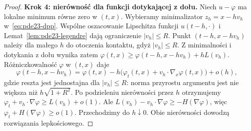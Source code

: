 \begin{proof}
\textbf{Krok 4: nierówność dla funkcji dotykającej z dołu.}
Niech $u-\varphi$ ma lokalne minimum równe zero
w $(t,x)$. Wybieramy minimalizator $z_h=x-hv_h$
w~\eqref{eq:pde23-dpp}. Wspólne oszacowanie Lipschitza
funkcji $u(t-h,\cdot)$ i Lemat~\ref{lem:pde23-legendre}
dają ograniczenie $|v_h|\le R$.
Punkt $(t-h,x-hv_h)$ należy dla małego $h$
do otoczenia kontaktu, gdyż $|v_h|\le R$.
Z minimalności i dotykania z dołu wynika zatem
$\varphi(t,x)\ge\varphi(t-h,x-hv_h)+hL(v_h)$.
Różniczkowalność $\varphi$ w $(t,x)$ daje
\[
 \varphi(t-h,x-hv_h)=\varphi(t,x)
 -h\bigl(\varphi_t(t,x)+v_h\cdot\nabla_x\varphi(t,x)\bigr)
 +o(h),
\]
gdzie reszta jest jednostajna dla $|v_h|\le R$:
norma przyrostu argumentu jest nie większa
niż $h\sqrt{1+R^2}$. Po podzieleniu nierówności
przez $h$ otrzymujemy
$\varphi_t+v_h\cdot\nabla\varphi\ge L(v_h)+o(1)$.
Ale $L(v_h)-v_h\cdot\nabla\varphi\ge-H(\nabla\varphi)$,
więc $\varphi_t+H(\nabla\varphi)\ge o(1)$.
Przechodzimy do $h\downarrow0$.
Obie nierówności dowodzą rozwiązania lepkościowego.
\end{proof}


